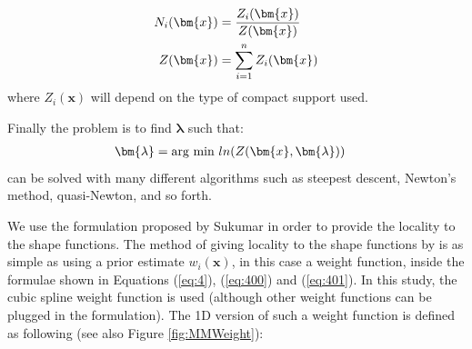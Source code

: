 \documentclass[oneside,11pt,times]{book}
\begin{document}
\begin{equation}
    \begin{aligned}\label{eq:400}
    \centering
    N_i(\bm{x})&=\frac{Z_i(\bm{x})}{Z(\bm{x})}\\
    Z(\bm{x})&=\sum_{i=1}^n Z_i(\bm{x})
    \end{aligned}
\end{equation}
where $Z_i(\bm{x})$ will depend on the type of compact support used.

Finally the problem is to find $\bm{\lambda}$ such that:
\begin{equation}
\begin{aligned}\label{eq:401}
\centering
\bm{\lambda}&=\text{arg min }ln(Z(\bm{x},\bm{\lambda}))
\end{aligned}
\end{equation}
 can be solved with many different algorithms such as steepest descent, Newton's method, quasi-Newton, and so forth.

We use the formulation proposed by Sukumar in order to provide the locality to the shape functions. The method of giving locality to the shape functions by \cite{sukumar:2007} is as simple as using a prior estimate $w_i(\bm{x})$, in this case a weight function, inside the formulae shown in Equations (\ref{eq:4}), (\ref{eq:400}) and (\ref{eq:401}). In this study, the cubic spline weight function is used (although other weight functions can be plugged in the formulation). The 1D version of such a weight function is defined as following (see also Figure \ref{fig:MMWeight}):
\end{document}
